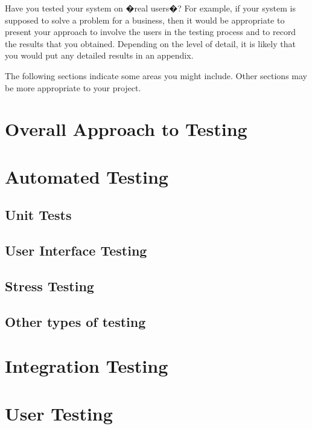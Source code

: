 Have you tested your system on �real users�? For example, if your system is supposed to solve a problem for a business, then it would be appropriate to present your approach to involve the users in the testing process and to record the results that you obtained. Depending on the level of detail, it is likely that you would put any detailed results in an appendix.

The following sections indicate some areas you might include. Other sections may be more appropriate to your project. 

\section{Overall Approach to Testing}

\section{Automated Testing}

\subsection{Unit Tests}

\subsection{User Interface Testing}

\subsection{Stress Testing}

\subsection{Other types of testing}

\section{Integration Testing}

\section{User Testing}